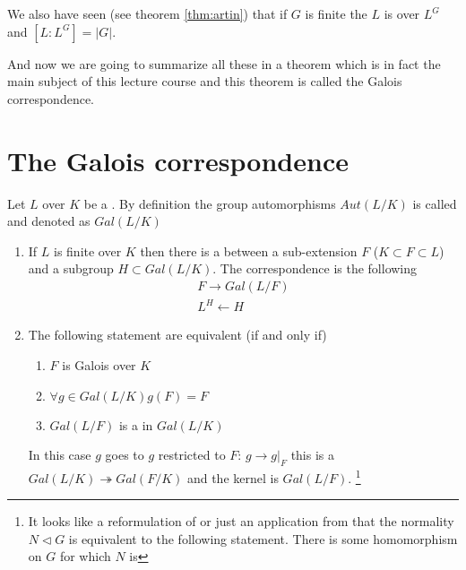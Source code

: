 We also have seen (see theorem \ref{thm:artin}) that if $G$ is finite
the $L$ is  over $L^G$ and
$\left[L:L^G\right] = \left|G\right|$.

And now we are going to summarize all these in a theorem which is in
fact the main subject of this lecture course and this theorem is
called the Galois correspondence. 

\section{The Galois correspondence}

Let $L$ over $K$ be a . By definition the
group automorphisms $Aut\left(L/K\right)$ is called
 and denoted as $Gal\left(L/K\right)$
\begin{theorem}
  \begin{enumerate}
  \item If $L$ is finite over $K$ then there is a
     between a sub-extension $F$
    ($K \subset F \subset L$) and a subgroup $H \subset
    Gal\left(L/K\right)$. The correspondence is the following
    \begin{eqnarray}
      F \rightarrow Gal\left(L/F\right)
      \nonumber \\
      L^H \leftarrow H
      \nonumber
    \end{eqnarray}
  \item The following statement are equivalent (if and only if)
    \begin{enumerate}
    \item $F$ is Galois over $K$ \label{thm:galoiscorrespondence:item2a}
    \item $\forall g \in Gal\left(L/K\right) g\left(F\right) = F$
    \item $Gal\left(L/F\right)$ is a  in
      $Gal\left(L/K\right)$ 
    \end{enumerate}
    In this case  $g$ goes to $g$ restricted to $F$: $g \to
    \left.g\right|_F$ this is a 
    $Gal\left(L/K\right) \twoheadrightarrow Gal\left(F/K\right)$ and
    the kernel is $Gal\left(L/F\right)$.
    \footnote{
      It looks like a reformulation of 
      or just an application from \cite{wiki:normalsubgroup} that the
      normality $N \triangleleft G$ is equivalent to the following
      statement. There is some homomorphism on $G$ for which $N$ is
}
\end{enumerate}
\end{theorem}
